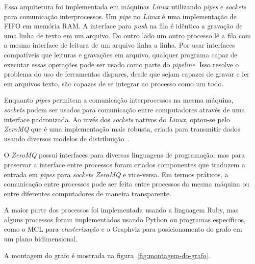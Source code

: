 \documentclass[12pt,a4paper]{article}
\theoremstyle{hypo}
\begin{document}
Essa arquitetura foi implementada em máquinas \textit{Linux} utilizando \textit{pipes} e \textit{sockets} para comunicação interprocessos. Um \textit{pipe} no \textit{Linux} é uma implementação de FIFO em memória RAM. A interface para \textit{push} na fila é idêntica a gravação de uma linha de texto em um arquivo. Do outro lado um outro processo lê a fila com a mesma interface de leitura de um arquivo linha a linha. Por usar interfaces compatíveis que leituras e gravações em arquivo, qualquer programa capaz de executar essas operações pode ser usado como parte do \textit{pipeline}. Isso resolve o problema do uso de ferramentas díspares, desde que sejam capazes de gravar e ler em arquivos texto, são capazes de se integrar ao processo como um todo.

Enquanto \textit{pipes} permitem a comunicação interprocessos na mesma máquina, \textit{sockets} podem ser usados para comunicação entre computadores através de uma interface padronizada. Ao invés dos \textit{sockets} nativos do \textit{Linux}, optou-se pelo \textit{ZeroMQ} que é uma implementação mais robusta, criada para transmitir dados usando diversos modelos de distribuição~\cite{Hintjens2013-tz}.

O \textit{ZeroMQ} possui interfaces para diversas linguagens de programação, mas para preservar a interface entre processos foram criados componentes que traduzem a entrada em \textit{pipes} para \textit{sockets ZeroMQ} e vice-versa. Em termos práticos, a comunicação entre processos pode ser feita entre processos da mesma máquina ou entre diferentes computadores de maneira transparente.

A maior parte dos processos foi implementada usando a linguagem Ruby, mas alguns processos foram implementados usando Python ou programas específicos, como o MCL para \textit{clusterização} e o Graphviz para posicionamento do grafo em um plano bidimensional.

A montagem do grafo é mostrada na figura~\ref{fig:montagem-do-grafo}.
\end{document}
